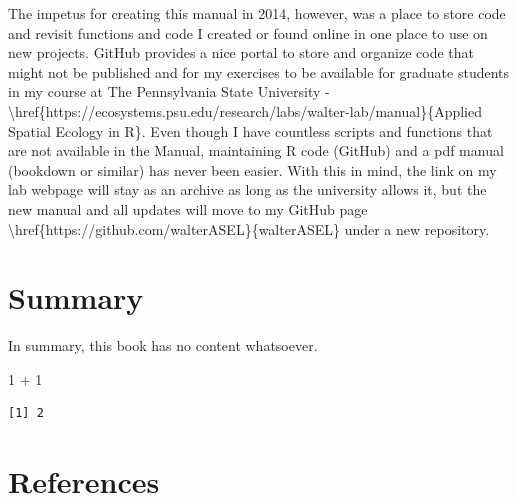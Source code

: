 \documentclass[
  letterpaper,
  DIV=11,
  numbers=noendperiod]{scrreprt}
\newenvironment{Shaded}{\begin{snugshade}}{\end{snugshade}}
\newcommand{\DecValTok}[1]{\textcolor[rgb]{0.68,0.00,0.00}{#1}}
\newcommand{\NormalTok}[1]{\textcolor[rgb]{0.00,0.23,0.31}{#1}}
\newcommand{\SpecialCharTok}[1]{\textcolor[rgb]{0.37,0.37,0.37}{#1}}
\newlength{\cslhangindent}
\newlength{\cslentryspacingunit} %
\newenvironment{CSLReferences}[2] %
 {%
  \setlength{\parindent}{0pt}
  \ifodd #1
  \let\oldpar\par
  \def\par{\hangindent=\cslhangindent\oldpar}
  \fi
  \setlength{\parskip}{#2\cslentryspacingunit}
 }%
 {}
\begin{document}
\begin{Shaded}
\begin{Highlighting}[]
\NormalTok{The impetus for creating this manual in 2014, however, was a place to store code and revisit functions and code I created or found online in one place to use on new projects. GitHub provides a nice portal to store and organize code that might not be published and for my exercises to be available for graduate students in my course at The Pennsylvania State University {-} \textbackslash{}href\{https://ecosystems.psu.edu/research/labs/walter{-}lab/manual\}\{Applied Spatial Ecology in R\}. Even though I have countless scripts and functions that are not available in the Manual, maintaining R code (GitHub) and a pdf manual (bookdown or similar) has never been easier. With this in mind, the link on my lab webpage will stay as an archive as long as the university allows it, but the new manual and all updates will move to my GitHub page \textbackslash{}href\{https://github.com/walterASEL\}\{walterASEL\} under a new repository.}
\end{Highlighting}
\end{Shaded}


\hypertarget{summary}{%
\chapter{Summary}\label{summary}}

In summary, this book has no content whatsoever.

\begin{Shaded}
\begin{Highlighting}[]
\DecValTok{1} \SpecialCharTok{+} \DecValTok{1}
\end{Highlighting}
\end{Shaded}

\begin{verbatim}
[1] 2
\end{verbatim}


\hypertarget{references}{%
\chapter*{References}\label{references}}


\hypertarget{refs}{}
\begin{CSLReferences}{0}{0}
\end{CSLReferences}
\end{document}
